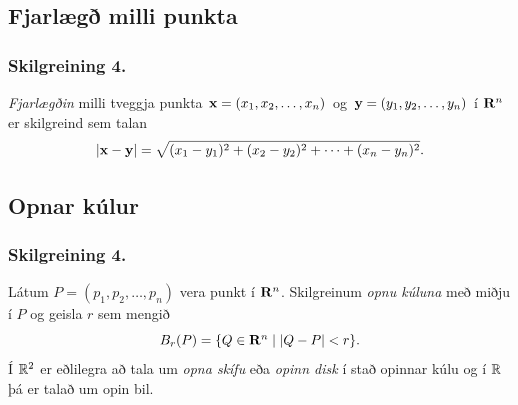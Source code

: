 \begin{figure} [h]
\begin {center}  \end {center}
\end {figure}  


\subsection{Fjarlægð milli punkta}
\subsubsection{Skilgreining 4.}
 {\em Fjarlægðin} milli tveggja punkta 
$\mbox{${\bf x}$}=(x_1,x_2, \ldots,x_n)$ og $\mbox{${\bf y}$}=(y_1,y_2, \ldots,y_n)$ í $\mbox{${\bf R}^n$}$ er skilgreind sem talan
$$|\mbox{${\bf x}$}-\mbox{${\bf y}$}|=\sqrt{(x_1-y_1)^2+(x_2-y_2)^2+\cdots+(x_n-y_n)^2}.$$
 



\subsection{Opnar kúlur}
 \subsubsection{Skilgreining 4.}
  Látum $P=(p_1,p_2,\ldots,p_n)$ vera punkt í
$\mbox{${\bf R}^n$}$.  Skilgreinum {\em opnu kúluna} með miðju í $P$ og geisla $r$ sem
mengið  
$$B_r(P)=\{Q\in\mbox{${\bf R}^n$}\mid |Q-P|<r\}.$$
Í ${\mathbb R}^2$ er eðlilegra að tala um {\em opna skífu} eða {\em opinn disk} í stað opinnar kúlu og í ${\mathbb R}$ þá er talað um opin bil.  

